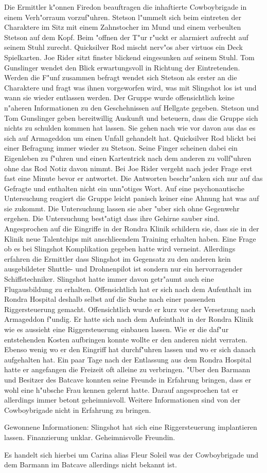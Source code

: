 
Die Ermittler k"onnen Firedon beauftragen die inhaftierte Cowboybrigade in einem Verh"orraum vorzuf"uhren. Stetson l"ummelt sich beim eintreten der Charaktere im Sitz mit einem Zahnstocher im Mund und einem verbeulten Stetson auf dem Kopf. Beim "offnen der T"ur r"uckt er alarmiert aufrecht auf seinem Stuhl zurecht. Quicksilver Rod mischt nerv"os aber virtuos ein Deck Spielkarten. Joe Rider sitzt finster blickend eingesunken auf seinem Stuhl. Tom Gunslinger wendet den Blick erwartungsvoll in Richtung der Eintretenden. Werden die F"unf zusammen befragt wendet sich Stetson als erster an die Charaktere und fragt was ihnen vorgeworfen wird, was mit Slingshot los ist und wann sie wieder entlassen werden. Der Gruppe wurde offensichtlich keine n"aheren Informationen zu den Geschehnissen auf Hellgate gegeben. Stetson und Tom Gunslinger geben bereitwillig Auskunft und beteuern, dass die Gruppe sich nichts zu schulden kommen hat lassen. Sie gehen nach wie vor davon aus das es sich auf Armageddon um einen Unfall gehandelt hat. Quicksilver Rod blickt bei einer Befragung immer wieder zu Stetson. Seine Finger scheinen dabei ein Eigenleben zu f"uhren und einen Kartentrick nach dem anderen zu vollf"uhren ohne das Rod Notiz davon nimmt. Bei Joe Rider vergeht nach jeder Frage erst fast eine Minute bevor er antwortet. Die Antworten beschr"anken sich nur auf das Gefragte und enthalten nicht ein unn"otiges Wort. Auf eine psychonautische Untersuchung reagiert die Gruppe leicht panisch keiner eine Ahnung hat was auf sie zukommt. Die Untersuchung lassen sie aber "uber sich ohne Gegenwehr ergehen. Die Untersuchung best"atigt dass ihre Gehirne sauber sind. Angesprochen auf die Eingriffe in der Rondra Klinik schildern sie, dass sie in der Klinik neue Talentchips mit anschlie\3endem Training erhalten haben. Eine Frage ob es bei Slingshot Komplikation gegeben hatte wird verneint. Allerdings erfahren die Ermittler dass Slingshot im Gegensatz zu den anderen kein ausgebildeter Shuttle- und Drohnenpilot ist sondern nur ein hervorragender Schiffstechniker. Slingshot hatte immer davon getr"aumt auch eine Flugausbildung zu erhalten. Offensichtlich hat er sich nach dem Aufenthalt im Rondra Hospital deshalb selbst auf die Suche nach einer passenden Riggersteuerung gemacht. Offensichtlich wurde er kurz vor der Versetzung nach Armageddon f"undig. Er hatte sich nach dem Aufeinthalt in der Rondra Klinik wie es aussieht eine Riggersteuerung einbauen lassen. Wie er die daf"ur entstehenden Kosten aufbringen konnte wollte er den anderen nicht verraten. Ebenso wenig wo er den Eingriff hat durchf"uhren lassen und wo er sich danach aufgehalten hat. Ein paar Tage nach der Entlassung aus dem Rondra Hospital hatte er angefangen die Freizeit oft alleine zu verbringen. "Uber den Barmann und Besitzer des Batcave konnten seine Freunde in Erfahrung bringen, dass er wohl eine h"ubsche Frau kennen gelernt hatte. Darauf angesprochen tat er allerdings immer betont geheimnisvoll. Weitere Informationen sind von der Cowboybrigade  nicht in Erfahrung zu bringen.

\begin{remarks}
	Gewonnene Informationen: Slingshot hat sich eine Riggersteuerung implantieren lassen. Finanzierung unklar. Geheimnisvolle Freundin. 
	
	Es handelt sich hierbei um Carina alias Fleur Soleil was der Cowboybrigade und dem Barmann im Batcave allerdings nicht bekannt ist.
\end{remarks}
